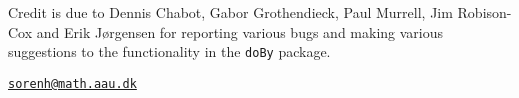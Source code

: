 Credit is due to Dennis Chabot, Gabor Grothendieck, Paul Murrell, Jim
Robison-Cox and Erik Jørgensen for reporting various bugs and making
various suggestions to the functionality in the \texttt{doBy} package.




\address{%
Søren Højsgaard\\
Department of Mathematical Sciences, Aalborg University, Denmark\\
Skjernvej 4A\\ 9220 Aalborg Ø, Denmark\\
}
\href{mailto:sorenh@math.aau.dk}{\nolinkurl{sorenh@math.aau.dk}}


